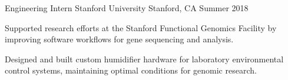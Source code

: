 \documentclass[12pt, letterpaper]{russell}
\begin{document}
\begin{cventries}
\vspace{0.1cm}

  \cventry
    {Engineering Intern} %
    {Stanford University} %
    {Stanford, CA} %
    {Summer 2018} %
    {
      \begin{cvitems}
        \item {Supported research efforts at the Stanford Functional Genomics Facility by improving software workflows for gene sequencing and analysis.}
        \item {Designed and built custom humidifier hardware for laboratory environmental control systems, maintaining optimal conditions for genomic research.}
      \end{cvitems}
    }

\end{cventries}
\end{document}
